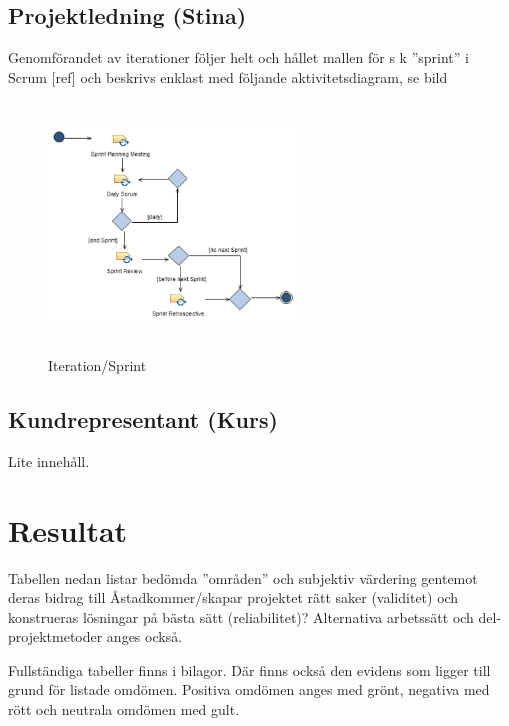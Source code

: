 \documentclass[conference]{IEEEtran}
\begin{document}
\subsection{Projektledning (Stina)}
Genomförandet av iterationer följer helt och hållet mallen för s k ”sprint” i Scrum [ref] 
och beskrivs enklast med följande aktivitetsdiagram, se  bild
\begin{figure}[htbp]
    \centerline{\includegraphics[max height=250px, max width=250px]{images/sprint.png}}
    \caption{Iteration/Sprint}
    \label{fig}
\end{figure}

\subsection{Kundrepresentant (Kurs)}
Lite innehåll.

\section{Resultat}
Tabellen nedan listar bedömda ”områden” och subjektiv värdering gentemot deras bidrag 
till Åstadkommer/skapar projektet rätt saker (validitet) och konstrueras lösningar på 
bästa sätt (reliabilitet)? Alternativa arbetssätt och del-projektmetoder anges också.

Fullständiga tabeller finns i bilagor. Där finns också den evidens som ligger till 
grund för listade omdömen. Positiva omdömen anges med grönt, negativa med rött och 
neutrala omdömen med gult. 
\end{document}

